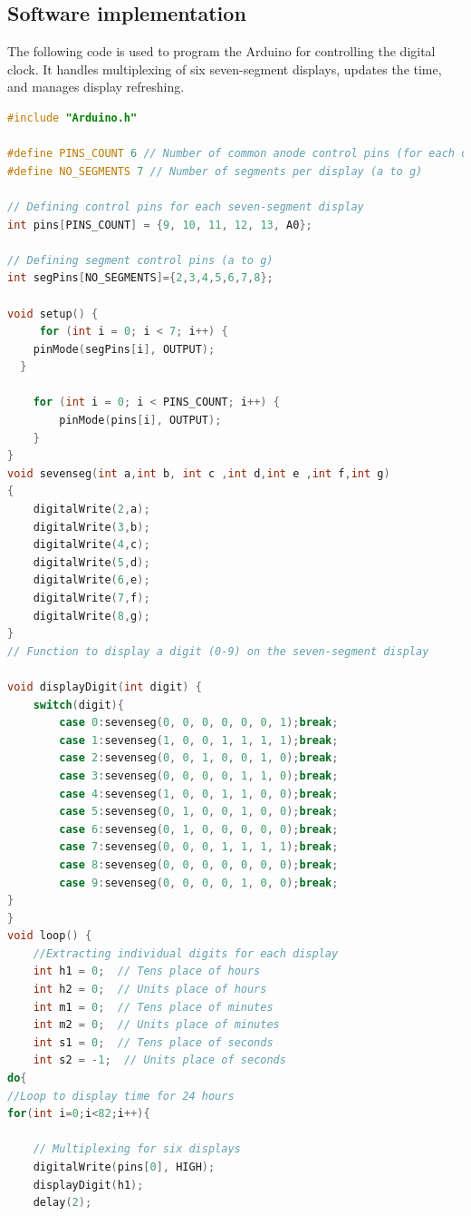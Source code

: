 \documentclass[journal]{IEEEtran}
\begin{document}
\subsection{Software implementation}
The following code is used to program the Arduino for controlling the digital clock. It handles multiplexing of six seven-segment displays, updates the time, and manages display refreshing.\\

\begin{lstlisting}[language=C++]
#include "Arduino.h"

#define PINS_COUNT 6 // Number of common anode control pins (for each display)
#define NO_SEGMENTS 7 // Number of segments per display (a to g)

// Defining control pins for each seven-segment display
int pins[PINS_COUNT] = {9, 10, 11, 12, 13, A0};

// Defining segment control pins (a to g)
int segPins[NO_SEGMENTS]={2,3,4,5,6,7,8};

void setup() {
	 for (int i = 0; i < 7; i++) {
    pinMode(segPins[i], OUTPUT);
  }

    for (int i = 0; i < PINS_COUNT; i++) {
        pinMode(pins[i], OUTPUT);
    }
}
void sevenseg(int a,int b, int c ,int d,int e ,int f,int g)
{
	digitalWrite(2,a);
	digitalWrite(3,b);
	digitalWrite(4,c);
	digitalWrite(5,d);
	digitalWrite(6,e);
	digitalWrite(7,f);
	digitalWrite(8,g);
}
// Function to display a digit (0-9) on the seven-segment display

void displayDigit(int digit) {
	switch(digit){
		case 0:sevenseg(0, 0, 0, 0, 0, 0, 1);break;
		case 1:sevenseg(1, 0, 0, 1, 1, 1, 1);break;
		case 2:sevenseg(0, 0, 1, 0, 0, 1, 0);break;
		case 3:sevenseg(0, 0, 0, 0, 1, 1, 0);break;
		case 4:sevenseg(1, 0, 0, 1, 1, 0, 0);break;
		case 5:sevenseg(0, 1, 0, 0, 1, 0, 0);break;
		case 6:sevenseg(0, 1, 0, 0, 0, 0, 0);break;
		case 7:sevenseg(0, 0, 0, 1, 1, 1, 1);break;
		case 8:sevenseg(0, 0, 0, 0, 0, 0, 0);break;
		case 9:sevenseg(0, 0, 0, 0, 1, 0, 0);break;		
}
}
void loop() {
    //Extracting individual digits for each display
    int h1 = 0;  // Tens place of hours
    int h2 = 0;  // Units place of hours
    int m1 = 0;  // Tens place of minutes
    int m2 = 0;  // Units place of minutes
    int s1 = 0;  // Tens place of seconds
    int s2 = -1;  // Units place of seconds
do{
//Loop to display time for 24 hours
for(int i=0;i<82;i++){

    // Multiplexing for six displays
    digitalWrite(pins[0], HIGH);
    displayDigit(h1);
    delay(2);
    

\end{lstlisting}
\end{document}
